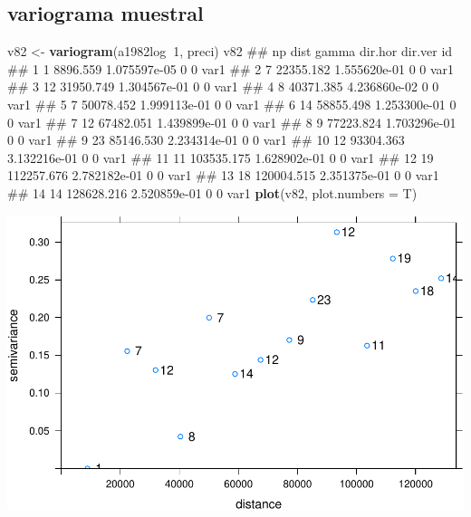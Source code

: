 \documentclass[11pt,]{article}
\newenvironment{Shaded}{\begin{snugshade}}{\end{snugshade}}
\newcommand{\KeywordTok}[1]{\textcolor[rgb]{0.13,0.29,0.53}{\textbf{#1}}}
\newcommand{\DataTypeTok}[1]{\textcolor[rgb]{0.13,0.29,0.53}{#1}}
\newcommand{\DecValTok}[1]{\textcolor[rgb]{0.00,0.00,0.81}{#1}}
\newcommand{\StringTok}[1]{\textcolor[rgb]{0.31,0.60,0.02}{#1}}
\newcommand{\OperatorTok}[1]{\textcolor[rgb]{0.81,0.36,0.00}{\textbf{#1}}}
\newcommand{\NormalTok}[1]{#1}
\begin{document}
\subsection{variograma muestral}\label{variograma-muestral}

\begin{Shaded}
\begin{Highlighting}[]
\NormalTok{v82 <-}\StringTok{ }\KeywordTok{variogram}\NormalTok{(a1982log}\OperatorTok{~}\DecValTok{1}\NormalTok{, preci)}
\NormalTok{v82}
\NormalTok{##    np       dist        gamma dir.hor dir.ver   id}
\NormalTok{## 1   1   8896.559 1.075597e-05       0       0 var1}
\NormalTok{## 2   7  22355.182 1.555620e-01       0       0 var1}
\NormalTok{## 3  12  31950.749 1.304567e-01       0       0 var1}
\NormalTok{## 4   8  40371.385 4.236860e-02       0       0 var1}
\NormalTok{## 5   7  50078.452 1.999113e-01       0       0 var1}
\NormalTok{## 6  14  58855.498 1.253300e-01       0       0 var1}
\NormalTok{## 7  12  67482.051 1.439899e-01       0       0 var1}
\NormalTok{## 8   9  77223.824 1.703296e-01       0       0 var1}
\NormalTok{## 9  23  85146.530 2.234314e-01       0       0 var1}
\NormalTok{## 10 12  93304.363 3.132216e-01       0       0 var1}
\NormalTok{## 11 11 103535.175 1.628902e-01       0       0 var1}
\NormalTok{## 12 19 112257.676 2.782182e-01       0       0 var1}
\NormalTok{## 13 18 120004.515 2.351375e-01       0       0 var1}
\NormalTok{## 14 14 128628.216 2.520859e-01       0       0 var1}
\KeywordTok{plot}\NormalTok{(v82, }\DataTypeTok{plot.numbers =}\NormalTok{ T)}
\end{Highlighting}
\end{Shaded}

\includegraphics[width=1\linewidth]{img/unnamed-chunk-14-1}
\end{document}
